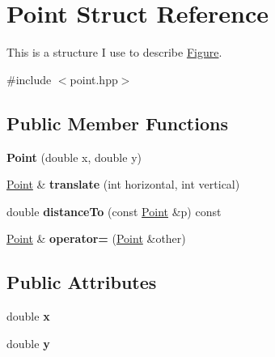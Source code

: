 \hypertarget{struct_point}{}\section{Point Struct Reference}
\label{struct_point}


This is a structure I use to describe \mbox{\hyperlink{class_figure}{Figure}}.  




{\ttfamily \#include $<$point.\+hpp$>$}

\subsection*{Public Member Functions}
\begin{DoxyCompactItemize}
\item 
\mbox{\label{struct_point_a78b55e8d5466bb8c2cf60fa55f2562ff}} 
{\bfseries Point} (double x, double y)
\item 
\mbox{\label{struct_point_a02dfe8d9f368a74a4cd122845293a6ce}} 
\mbox{\hyperlink{struct_point}{Point}} \& {\bfseries translate} (int horizontal, int vertical)
\item 
\mbox{\label{struct_point_ae780520d0c2b9b81230e7fefcbe59505}} 
double {\bfseries distance\+To} (const \mbox{\hyperlink{struct_point}{Point}} \&p) const
\item 
\mbox{\label{struct_point_ac9d84002ef348ca9ebe5eb6c9d08abe7}} 
\mbox{\hyperlink{struct_point}{Point}} \& {\bfseries operator=} (\mbox{\hyperlink{struct_point}{Point}} \&other)
\end{DoxyCompactItemize}
\subsection*{Public Attributes}
\begin{DoxyCompactItemize}
\item 
\mbox{\label{struct_point_ab99c56589bc8ad5fa5071387110a5bc7}} 
double {\bfseries x}
\item 
\mbox{\label{struct_point_afa38be143ae800e6ad69ce8ed4df62d8}} 
double {\bfseries y}
\end{DoxyCompactItemize}
